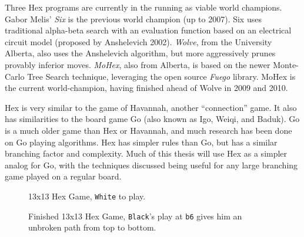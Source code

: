 \documentclass[11pt]{report}
\newcommand{\black}{\texttt{Black}}
\newcommand{\white}{\texttt{White}}
\newcommand{\loc}[1]{\texttt{#1}}
\begin{document}
Three Hex programs are currently in the running as viable world champions. Gabor Melis' \emph{Six} is the previous world champion (up to 2007). Six uses traditional alpha-beta search with an evaluation function based on an electrical circuit model (proposed by Anshelevich 2002)\cite{anshelevich2002hierarchical}. \emph{Wolve}, from the University Alberta, also uses the Anshelevich algorithm, but more aggressively prunes provably inferior moves. \emph{MoHex}, also from Alberta, is based on the newer Monte-Carlo Tree Search technique, leveraging the open source \emph{Fuego} library. MoHex is the current world-champion, having finished ahead of Wolve in 2009 and 2010.

Hex is very similar to the game of Havannah, another ``connection'' game. It also has similarities to the board game Go (also known as Igo, Weiqi, and Baduk). Go is a much older game than Hex or Havannah, and much research has been done on Go playing algorithms. Hex has simpler rules than Go, but has a similar branching factor and complexity. Much of this thesis will use Hex as a simpler analog for Go, with the techniques discussed being useful for any large branching game played on a regular board.

\begin{figure}
	\begin{HexBoard}[board size=13]
	\end{HexBoard}
	\caption{13x13 Hex Game, \white{} to play.}
	\label{fig:13x13inprogress}
\end{figure}

\begin{figure}
	\begin{HexBoard}[board size=13]
	\end{HexBoard}
	\caption{Finished 13x13 Hex Game, \black{}'s play at \loc{b6} gives him an unbroken path from top to bottom.}
	\label{fig:13x13finished}
\end{figure}
\end{document}
